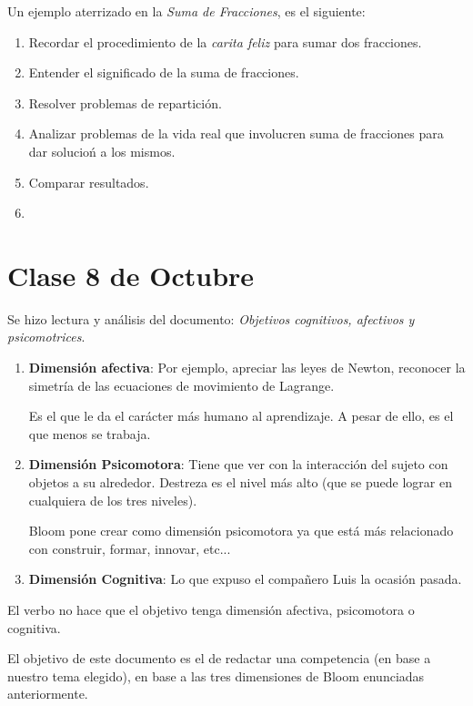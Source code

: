 \documentclass[12pt]{report}
\newcounter{it}
\theoremstyle{largebreak}
\begin{document}
    Un ejemplo aterrizado en la \textit{Suma de Fracciones}, es el siguiente:
    \begin{enumerate}
        \item Recordar el procedimiento de la \textit{carita feliz} para sumar dos fracciones.
        \item Entender el significado de la suma de fracciones.
        \item Resolver problemas de repartición.
        \item Analizar problemas de la vida real que involucren suma de fracciones para dar solucioń a los mismos.
        \item Comparar resultados.
        \item 
    \end{enumerate}

    \section{Clase 8 de Octubre}

    Se hizo lectura y análisis del documento: \textit{Objetivos cognitivos, afectivos y psicomotrices}.

    \begin{enumerate}
        \item \textbf{Dimensión afectiva}: Por ejemplo, apreciar las leyes de Newton, reconocer la simetría de las ecuaciones de movimiento de Lagrange.
        
        Es el que le da el carácter más humano al aprendizaje. A pesar de ello, es el que menos se trabaja.
        \item \textbf{Dimensión Psicomotora}: Tiene que ver con la interacción del sujeto con objetos a su alrededor. Destreza es el nivel más alto (que se puede lograr en cualquiera de los tres niveles).
        
        Bloom pone crear como dimensión psicomotora ya que está más relacionado con construir, formar, innovar, etc...
        \item \textbf{Dimensión Cognitiva}: Lo que expuso el compañero Luis la ocasión pasada.
    \end{enumerate}

    El verbo no hace que el objetivo tenga dimensión afectiva, psicomotora o cognitiva.

    El objetivo de este documento es el de redactar una competencia (en base a nuestro tema elegido), en base a las tres dimensiones de Bloom enunciadas anteriormente.
\end{document}
